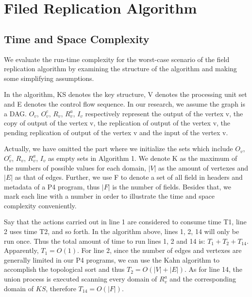 \documentclass[sigconf, 10pt]{acmart}
\theoremstyle{plain}
\begin{document}
\section{Filed Replication Algorithm}





\subsection{Time and Space Complexity}
We evaluate the run-time complexity for the worst-case scenario of the field replication algorithm by examining the structure of the algorithm and making some simplifying assumptions.

In the algorithm, KS denotes the key structure, V denotes the processing unit set and E denotes the control flow sequence. In our research, we assume the graph is a DAG. $O_{v}$,  $O^{c}_{v}$, $R_{v}$, $R^{a}_{v}$, $I_{v}$ respectively represent the output of the vertex v, the copy of output of the vertex v, the replication of output of the vertex v, the pending replication of output of the vertex v and the input of the vertex v.

Actually, we have omitted the part where we initialize the sets which include $O_{v}$,  $O^{c}_{v}$, $R_{v}$, $R^{a}_{v}$, $I_{v}$ as empty sets in Algorithm 1. We denote K as the maximum of the numbers of possible values for each domain, $|V|$ as the amount of vertexes and $|E|$ as that of edges. Further, we use F to denote a set of all field in headers and metadata of a P4 program, thus $|F|$ is the number of fields. Besides that, we mark each line with a number in order to illustrate the time and space complexity conveniently.

Say that the actions carried out in line 1 are considered to consume time T1, line 2 uses time T2, and so forth.
In the algorithm above, lines 1, 2, 14 will only be run once. Thus the total amount of time to run lines 1, 2 and 14 is:
$ T_{1}+T_{2}+T_{14}.$ Apparently, $ T_{1} = O(1)$. For line 2, since the number of edges and vertexes are generally limited in our P4 programs, we can use the Kahn algorithm to accomplish the topological sort and thus $ T_{2} = O(|V| + |E|)$. As for line 14, the union process is executed scanning every domain of $R^{a}_{v}$ and the corresponding domain of $KS$, therefore $ T_{14} = O(|F|)$.
\end{document}

